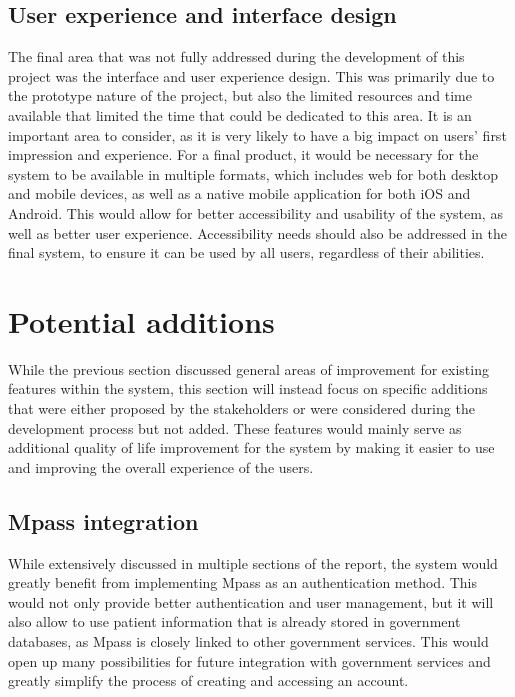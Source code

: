 \subsection{User experience and interface design}

The final area that was not fully addressed during the development of this project was the interface and user experience design. This was primarily due to the prototype nature of the project, but also the limited resources and time available that limited the time that could be dedicated to this area. It is an important area to consider, as it is very likely to have a big impact on users' first impression and experience. For a final product, it would be necessary for the system to be available in multiple formats, which includes web for both desktop and mobile devices, as well as a native mobile application for both iOS and Android. This would allow for better accessibility and usability of the system, as well as better user experience. Accessibility needs should also be addressed in the final system, to ensure it can be used by all users, regardless of their abilities.

\section{Potential additions}\label{sec:future_work}

While the previous section discussed general areas of improvement for existing features within the system, this section will instead focus on specific additions that were either proposed by the stakeholders or were considered during the development process but not added. These features would mainly serve as additional quality of life improvement for the system by making it easier to use and improving the overall experience of the users.

\subsection{Mpass integration}

While extensively discussed in multiple sections of the report, the system would greatly benefit from implementing Mpass as an authentication method. This would not only provide better authentication and user management, but it will also allow to use patient information that is already stored in government databases, as Mpass is closely linked to other government services. This would open up many possibilities for future integration with government services and greatly simplify the process of creating and accessing an account. 

